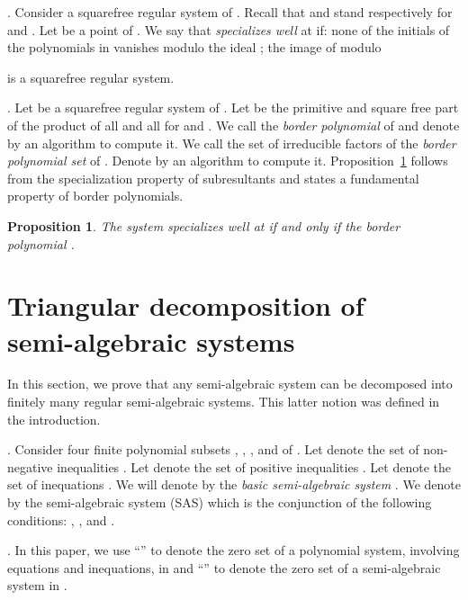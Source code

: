 \documentclass{sig-alternate}
\newtheorem{Proposition}{Proposition}
\begin{document}
\smallskip{}. 
Consider a squarefree regular system  of .
Recall that  and  
stand respectively for  and .
Let  be a point of .
We say that  {\em specializes well} at  if:
 none of the initials of the polynomials in  vanishes
modulo the ideal ;
 the image of  modulo 
              
              is a squarefree regular system.


\smallskip{}. 
Let  be a squarefree regular system of .
Let  be the primitive and square free part of 
the product of all
 and all  for  and .
We call  the {\em border polynomial} of 
and denote by  an algorithm to compute it. 
We call the set of irreducible factors of  the
{\em border  polynomial set} of .
Denote by  an algorithm
to compute it.
Proposition~\ref{Proposition:borderpolynomial}
follows from 
the specialization property of subresultants
and states a fundamental property of border polynomials.


\begin{Proposition}
\label{Proposition:borderpolynomial}
The system  specializes well at  if and only if 
the border polynomial .
\end{Proposition}



\section{Triangular decomposition of \\
semi-algebraic systems}
\label{sect:specification}
In this section, we  prove that any semi-algebraic system can be decomposed 
into finitely many regular semi-algebraic systems.
This latter notion was defined in the introduction.

\smallskip{}. 
Consider four finite polynomial subsets
,
,
,
and  
of .
Let  denote the set of non-negative inequalities 
.
Let  denote the set of positive inequalities
.
Let  denote the set of inequations .
We will denote by  the {\em basic semi-algebraic system}
.
We denote by 
the semi-algebraic system ({\small SAS}) 
which is the conjunction of the following conditions:
,
,
 and
.


\smallskip{}. 
In this paper, we use ``'' to denote the zero set of 
a polynomial system, involving equations and inequations, in  
and ``'' to denote the zero set
of a semi-algebraic system in .
\end{document}
